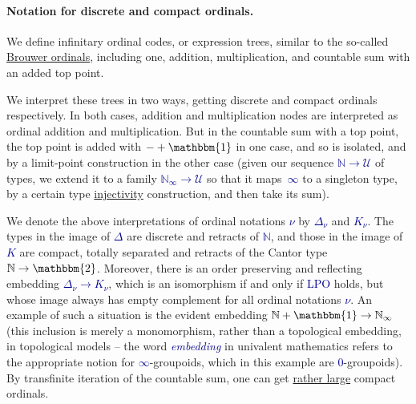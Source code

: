 \documentclass[a4paper]{easychair}
\newcommand{\db}{\textcolor{darkblue}}
\newcommand{\Kappa}{K}
\newcommand{\df}[1]{\emph{\db{#1}}}
\newcommand{\m}[1]{\db{$#1$}}
\newcommand{\N}{\mathbb{N}}
\newcommand{\NI}{\N_\infty}
\newcommand{\U}{\mathcal{U}}
\newcommand{\One}{\mathbbm{1}}
\newcommand{\Two}{\mathbbm{2}}
\begin{document}
\paragraph{Notation for discrete and compact ordinals.}
We define infinitary ordinal codes, or expression trees, similar to
the so-called
\href{http://www.cse.chalmers.se/~coquand/ordinal.ps}{Brouwer
  ordinals}, including one, addition, multiplication, and countable
sum with an added top point.

We interpret these trees in two ways, getting discrete and compact
ordinals respectively. In both cases, addition and multiplication
nodes are interpreted as ordinal addition and multiplication. But in
the countable sum with a top point, the top point is added with
\m{-+\One} in one case, and so is isolated, and by a limit-point
construction in the other case (given our sequence \m{\N \to \U} of
types, we extend it to a family \m{\NI \to \U} so that it
maps~\m{\infty} to a singleton type, by a certain type
\href{https://en.wikipedia.org/wiki/Injective_object}{injectivity}
construction, and then take its sum).

We denote the above interpretations of ordinal notations \m{\nu} by
\m{\Delta_\nu} and \m{\Kappa_\nu}. The types in the image of
\m{\Delta} are discrete and retracts of \m{\N}, and those in the image
of \m{\Kappa} are compact, totally separated and retracts of the
Cantor type \m{\N \to \Two}.  Moreover, there is an order preserving
and reflecting embedding \m{\Delta_\nu \to \Kappa_\nu}, which is an
isomorphism if and only if \db{LPO} holds, but whose image always has
empty complement for all ordinal notations \m{\nu}. An example of such
a situation is the evident embedding \m{\N + \One \to \NI} (this
inclusion is merely a monomorphism, rather than a topological
embedding, in topological models -- the word \df{embedding} in
univalent mathematics refers to the appropriate notion for
\m{\infty}-groupoids, which in this example are \m{0}-groupoids).  By
transfinite iteration of the countable sum, one can get
\href{http://www.cs.swan.ac.uk/~csetzer/articles/weor0.pdf}{rather
  large} compact ordinals.
\end{document}
